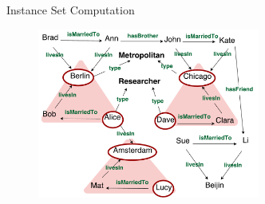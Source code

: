 \documentclass{beamer}
\newcommand{\mi}[1]{\ensuremath{\mathit{#1}}}
\begin{document}
\begin{frame}{Instance Set Computation}
{\smallskip

\begin{figure}[h]
	\centering
	\includegraphics[page=1,width=0.65\textwidth]{kg_advanced_col_2.pdf}
\end{figure}
}

\end{frame}


\end{document}
